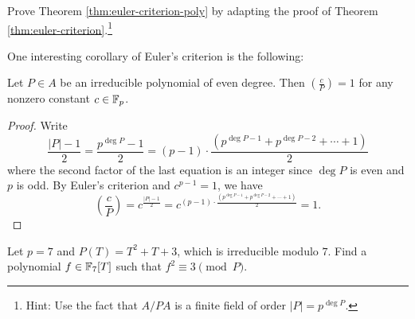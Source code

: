 \begin{exercise}
    Prove Theorem \ref{thm:euler-criterion-poly} by adapting the proof of Theorem \ref{thm:euler-criterion}.\footnote{Hint: Use the fact that $A / P A$ is a finite field of order $|P| = p^{\deg P}$.}
\end{exercise}
One interesting corollary of Euler's criterion is the following:
\begin{corollary}
    \label{cor:even-deg-qr}
    Let $P \in A$ be an irreducible polynomial of even degree.
    Then $\left(\frac{c}{P}\right) = 1$ for any nonzero constant $c \in \mathbb{F}_p$.
\end{corollary}
\begin{proof}
    Write
    \[
    \frac{|P| - 1}{2} = \frac{p^{\deg P} - 1}{2} = (p-1) \cdot \frac{(p^{\deg P - 1} + p^{\deg P - 2} + \cdots + 1)}{2}
    \]
    where the second factor of the last equation is an integer since $\deg P$ is even and $p$ is odd.
    By Euler's criterion and $c^{p-1} = 1$, we have
    \[
    \left(\frac{c}{P}\right) = c^{\frac{|P| - 1}{2}} = c^{(p-1) \cdot \frac{(p^{\deg P - 1} + p^{\deg P - 2} + \cdots + 1)}{2}} = 1.
    \]
\end{proof}
\begin{exercise}
    Let $p = 7$ and $P(T) = T^2 + T + 3$, which is irreducible modulo $7$.
    Find a polynomial $f \in \mathbb{F}_7[T]$ such that $f^2 \equiv 3 \pmod{P}$.
\end{exercise}

